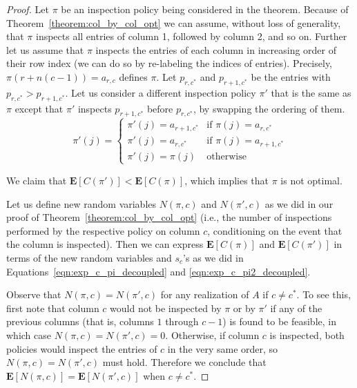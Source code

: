  \begin{proof}
 	Let $\pi$ be an inspection policy being considered in the theorem.
 	Because of Theorem~\ref{theorem:col_by_col_opt} we can assume, without loss of generality, that $\pi$ inspects all entries of column 1, followed by column 2, and so on.
 	Further let us assume that $\pi$ inspects the entries of each column in increasing order of their row index (we can do so by re-labeling the indices of entries). Precisely, $\pi(r + n (c-1)) = a_{r,c}$ defines $\pi$. Let $p_{r,c^*}$ and $p_{r+1,c^*}$ be the entries with $p_{r,c^*} > p_{r+1, c^*}$.
 	Let us consider a different inspection policy $\pi'$ that is the same as $\pi$ except that $\pi'$ inspects $p_{r+1,c^*}$ before $p_{r,c^*}$, by swapping the ordering of them.
 	\begin{equation*}
 		\pi'(j) = 
 		\begin{cases}
 			\pi'(j) = a_{r+1,c^*}  &  \mbox{if~} \pi(j) = a_{r,c^*} \\
 			\pi'(j) = a_{r,c^*}    &  \mbox{if~} \pi(j) = a_{r+1,c^*} \\
 			\pi'(j) = \pi(j)     &  \mbox{otherwise} 
 		\end{cases}
 	\end{equation*}	
	
 	We claim that $\mathbf{E}[C(\pi')] < \mathbf{E}[C(\pi)]$, which implies that $\pi$ is not optimal.
	
 	Let us define new random variables $N(\pi, c)$ and $N(\pi', c)$ as we did in our proof of Theorem~\ref{theorem:col_by_col_opt} (i.e., the number of inspections performed by the respective policy on column $c$, conditioning on the event that the column is inspected).
 	Then we can express $\mathbf{E}[C(\pi)]$ and $\mathbf{E}[C(\pi')]$ in terms of the new random variables and $s_c$'s as we did in Equations~\ref{eqn:exp_c_pi_decoupled} and \ref{eqn:exp_c_pi2_decoupled}.
	
 	Observe that $N(\pi, c) = N(\pi', c)$ for any realization of $A$ if $c \neq c^*$.
 	To see this, first note that column $c$ would not be inspected by $\pi$ or by $\pi'$ if any of the previous columns (that is, columns $1$ through $c-1$) is found to be feasible, in which case $N(\pi, c) = N(\pi', c) = 0$. Otherwise, if column $c$ is inspected, both policies would inspect the entries of $c$ in the very same order, so $N(\pi, c) = N(\pi', c)$ must hold. Therefore we conclude that $\mathbf{E}[N(\pi, c)] = \mathbf{E}[N(\pi', c)]$ when $c \neq c^*$. 
	

\end{proof}
